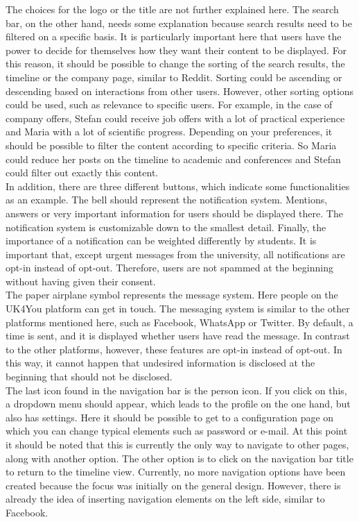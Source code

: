 The choices for the logo or the title are not further explained here.
The search bar, on the other hand, needs some explanation because search results need to be filtered on a specific basis.
It is particularly important here that users have the power to decide for themselves how they want their content to be displayed.
For this reason, it should be possible to change the sorting of the search results, the timeline or the company page, similar to Reddit.
Sorting could be ascending or descending based on interactions from other users.
However, other sorting options could be used, such as relevance to specific users.
For example, in the case of company offers, Stefan could receive job offers with a lot of practical experience and Maria with a lot of scientific progress.
Depending on your preferences, it should be possible to filter the content according to specific criteria.
So Maria could reduce her posts on the timeline to academic and conferences and Stefan could filter out exactly this content.\\

In addition, there are three different buttons, which indicate some functionalities as an example.
The bell should represent the notification system.
Mentions, answers or very important information for users should be displayed there.
The notification system is customizable down to the smallest detail.
Finally, the importance of a notification can be weighted differently by students.
It is important that, except urgent messages from the university, all notifications are opt-in instead of opt-out.
Therefore, users are not spammed at the beginning without having given their consent.\\

The paper airplane symbol represents the message system.
Here people on the UK4You platform can get in touch.
The messaging system is similar to the other platforms mentioned here, such as Facebook, WhatsApp or Twitter.
By default, a time is sent, and it is displayed whether users have read the message.
In contrast to the other platforms, however, these features are opt-in instead of opt-out.
In this way, it cannot happen that undesired information is disclosed at the beginning that should not be disclosed.\\

The last icon found in the navigation bar is the person icon.
If you click on this, a dropdown menu should appear, which leads to the profile on the one hand, but also has settings.
Here it should be possible to get to a configuration page on which you can change typical elements such as password or e-mail.
At this point it should be noted that this is currently the only way to navigate to other pages, along with another option.
The other option is to click on the navigation bar title to return to the timeline view.
Currently, no more navigation options have been created because the focus was initially on the general design.
However, there is already the idea of inserting navigation elements on the left side, similar to Facebook.\\

